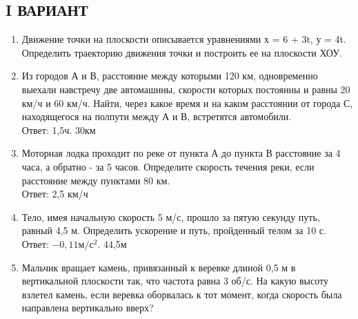 \documentclass[a6paper, 11pt]{diss_4}
\renewcommand{\'}{\,'}
\begin{document}
\subsection{I ВАРИАНТ}
\begin{enumerate}
\item Движение точки на плоскости описывается уравнениями х = 6 + 3t, у = 4t. Определить траекторию движения точки и построить ее на плоскости ХОУ.
\item Из городов А и В, расстояние между которыми 120 км, одновременно выехали навстречу две автомашины, скорости которых постоянны и равны 20 км/ч и 60 км/ч. Найти, через какое время и на каком расстоянии от города С, находящегося на полпути между А и В, встретятся автомобили.
\\ Ответ: 1,5ч. 30км
\item Моторная лодка проходит по реке от пункта А до пункта В расстояние за 4 часа, а обратно - за 5 часов. Определите скорость течения реки, если расстояние между пунктами 80 км.
\\ Ответ: 2,5 км/ч
\item Тело, имея начальную скорость 5 м/с, прошло за пятую секунду путь, равный 4,5 м. Определить ускорение и путь, пройденный телом за 10 с.
\\ Ответ: $-0,11м/с^2$.  44,5м

\item Мальчик вращает камень, привязанный к веревке длиной 0,5 м в вертикальной плоскости так, что частота равна 3 об/с. На какую высоту взлетел камень, если веревка оборвалась к тот момент, когда скорость была направлена вертикально вверх?
\end{enumerate}
\end{document}
